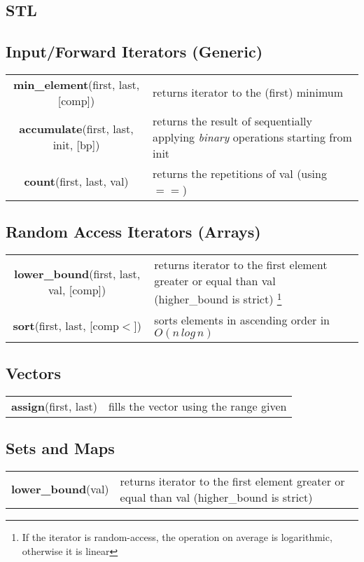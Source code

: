 \pagebreak

\subsection{STL}

{\centering \subsection*{Input/Forward Iterators (Generic)}}
\begin{tabularx}{\textwidth/2-20pt}{c X}
    \textbf{min\_element}(first, last, [comp]) & returns iterator to the (first) minimum \\
    \textbf{accumulate}(first, last, init, [bp]) & returns the result of sequentially applying \textit{binary} operations starting from init \\
    \textbf{count}(first, last, val) & returns the repetitions of val (using $==$)
\end{tabularx}

{\centering \subsection*{Random Access Iterators (Arrays)}}
\begin{tabularx}{\textwidth/2-20pt}{c X}
    \textbf{lower\_bound}(first, last, val, [comp]) & returns iterator to the first element greater or equal than val (higher\_bound is strict) \footnote{If the iterator is random-access, the operation on average is logarithmic, otherwise it is linear} \\
    \textbf{sort}(first, last, [comp$<$]) & sorts elements in ascending order in $O(n \, log \, n)$
\end{tabularx}

{\centering \subsection*{Vectors}}
\begin{tabularx}{\textwidth/2-20pt}{c X}
    \textbf{assign}(first, last) & fills the vector using the range given \\
\end{tabularx}

{\centering \subsection*{Sets and Maps}}
\begin{tabularx}{\textwidth/2-20pt}{c X}
    \textbf{lower\_bound}(val) & returns iterator to the first element greater or equal than val (higher\_bound is strict)
\end{tabularx}

